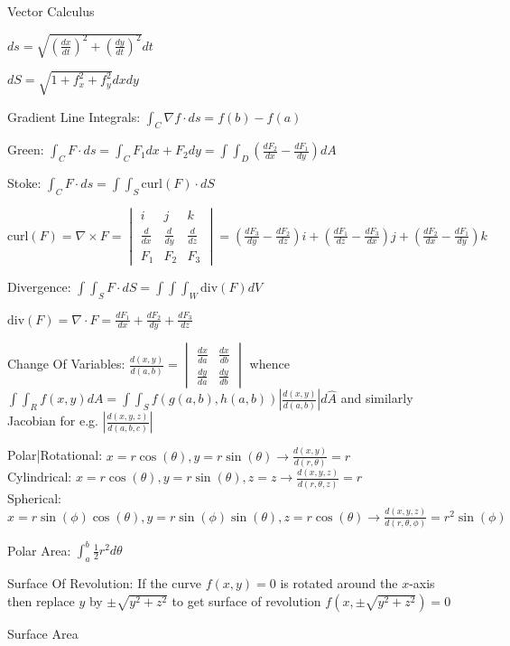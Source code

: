Vector Calculus

$ds=\sqrt{\left(\frac{dx}{dt} \right)^2 + \left(\frac{dy}{dt} \right)^2} dt$

$dS = \sqrt{1+f_x^2+f_y^2} dx dy$

Gradient Line Integrals: $\int_C \nabla f \cdot ds = f(b)-f(a)$

Green: $\int_C F \cdot ds = \int_C F_1 dx + F_2 dy = \int \int_D \left(\frac{dF_2}{dx} - \frac{dF_1}{dy} \right) dA$

Stoke: $\int_C F \cdot ds = \int \int_S \text{curl}(F) \cdot dS$

$\text{curl}(F) = \nabla \times F = \begin{vmatrix} i & j & k \\ \frac{d}{dx} & \frac{d}{dy} & \frac{d}{dz} \\ F_1 & F_2 & F_3 \end{vmatrix} = \left(\frac{dF_3}{dy}-\frac{dF_2}{dz} \right) i + \left(\frac{dF_1}{dz}-\frac{dF_3}{dx} \right) j + \left(\frac{dF_2}{dx}-\frac{dF_1}{dy} \right) k$

Divergence: $\int \int_S F \cdot dS = \int \int \int_W \text{div}(F)dV$

$\text{div}(F)=\nabla \cdot F=\frac{dF_1}{dx}+\frac{dF_2}{dy}+\frac{dF_3}{dz}$

Change Of Variables: $\frac{d(x,y)}{d(a,b)} = \begin{vmatrix} \frac{dx}{da} & \frac{dx}{db} \\ \frac{dy}{da} & \frac{dy}{db} \end{vmatrix}$ whence $\int \int_R f(x,y) dA = \int \int_S f(g(a,b),h(a,b)) \left| \frac{d(x,y)}{d(a,b)} \right| d\hat{A}$ and similarly Jacobian for e.g. $\left| \frac{d(x,y,z)}{d(a,b,c)} \right|$

Polar|Rotational: $x=r\cos(\theta), y=r\sin(\theta) \to \frac{d(x,y)}{d(r,\theta)}=r$ \\
Cylindrical: $x=r\cos(\theta),y=r\sin(\theta),z=z \to \frac{d(x,y,z)}{d(r,\theta,z)}=r$ \\
Spherical: $x=r\sin(\phi)\cos(\theta),y=r\sin(\phi)\sin(\theta),z=r\cos(\theta) \to \frac{d(x,y,z)}{d(r,\theta,\phi)}=r^2\sin(\phi)$

Polar Area: $\int_a^b \frac{1}{2}r^2 d\theta$

Surface Of Revolution: If the curve $f(x,y)=0$ is rotated around the $x$-axis then replace $y$ by $\pm \sqrt{y^2+z^2}$ to get surface of revolution $f(x,\pm \sqrt{y^2+z^2})=0$

Surface Area

